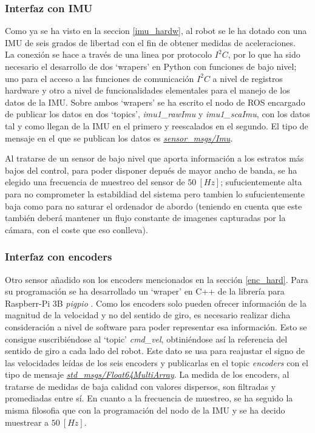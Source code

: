 \subsubsection{Interfaz con IMU}
Como ya se ha visto en la seccion \ref{imu_hardw}, al robot se le ha dotado con una IMU de seis grados de libertad con el fin de obtener medidas de aceleraciones.\\
La conexión se hace a través de una linea por protocolo $I^2C$, por lo que ha sido necesario el desarrollo de dos `wrapers' en Python con funciones de bajo nivel; uno para el acceso a las
funciones de comunicación $I^2C$ a nivel de registros hardware y otro a nivel de funcionalidades elementales para el manejo de los datos de la IMU.
Sobre ambos `wrapers' se ha escrito el nodo de ROS encargado de publicar los datos en dos `topics', \textit{imu1\_rawImu} y \textit{imu1\_scaImu}, con los datos tal y como llegan 
de la IMU en el primero y reescalados en el segundo. El tipo de mensaje en el que se publican los datos es \textit{\href{http://docs.ros.org/kinetic/api/sensor_msgs/html/msg/Imu.html}{sensor\_msgs/Imu}}.\par
Al tratarse de un sensor de bajo nivel que aporta información a los estratos más bajos del control, para poder disponer depués de mayor ancho de banda, se ha elegido una frecuencia de muestreo del sensor de $50\ [Hz]$; sufucientemente alta para no comprometer la estabildiad del sistema
pero tambien lo sufucientemente baja como para no saturar el ordenador de abordo (teniendo en cuenta que este también deberá mantener un flujo constante de imagenes capturadas por la cámara, con el coste que eso conlleva).

 \subsubsection{Interfaz con encoders}\label{enc_soft}
Otro sensor añadido son los encoders mencionados en la sección \ref{enc_hard}. Para su programación se ha desarrollado un `wraper' en C++ de la librería para Raspberr-Pi 3B \textit{pigpio} 
\cite{pigpio}. Como los encoders solo pueden ofrecer información de la magnitud de la velocidad y no del sentido de giro, es necesario realizar dicha consideración a nivel de software para poder representar esa información.
Esto se consigue suscribiéndose al `topic' \textit{cmd\_vel}, obtiniéndose así la referencia del sentido de giro a cada lado del robot. Este dato se usa para reajustar el signo de las velocidades leídas de los seis encoders y publicarlas en el topic \textit{encoders} con el tipo de mensaje \textit{\href{http://docs.ros.org/jade/api/std_msgs/html/msg/Float64MultiArray.html}{std\_msgs/Float64MultiArray}}. La medida de los encoders, al tratarse de medidas de baja calidad con valores dispersos, son filtradas y promediadas entre sí. En cuanto a la frecuencia de muestreo, se ha seguido la misma filosofia que con la programación del nodo de la IMU y se ha decido muestrear a $50\ [Hz]$.

